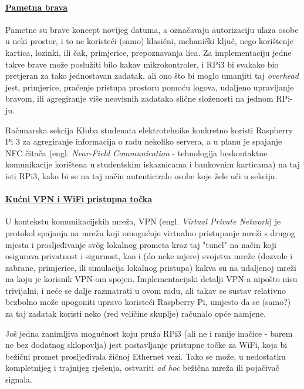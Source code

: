 \documentclass[12pt,a4paper]{article}
\begin{document}
	\paragraph{\underline{Pametna brava}} %
	\label{par:smart_lock}
		Pametne su brave koncept novijeg datuma, a označavaju autorizaciju ulaza osobe u neki prostor, i to ne koristeći (samo) klasični, mehanički ključ, nego korištenje kartica, lozinki, ili čak, primjerice, prepoznavanja lica. Za implementaciju jedne takve brave može poslužiti bilo kakav mikrokontroler, i RPi3 bi svakako bio pretjeran za tako jednostavan zadatak, ali ono što bi moglo umanjiti taj \textit{overhead} jest, primjerice, praćenje pristupa prostoru pomoću logova, udaljeno upravljanje bravom, ili agregiranje više neovisnih zadataka slične složenosti na jednom RPi-ju.
		\par Računarska sekcija Kluba studenata elektrotehnike konkretno koristi Raspberry Pi 3 za agregiranje informacija o radu nekoliko servera, a u planu je spajanje NFC čitača (engl. \textit{Near-Field Communication} - tehnologija beskontaktne komunikacije korištena u studentskim iskaznicama i bankovnim karticama) na taj isti RPi3, kako bi se na taj način autenticiralo osobe koje žele ući u sekciju.


	\paragraph{\underline{Kućni VPN i WiFi pristupna točka}} %
	\label{par:home_vpn}
		U kontekstu komunikacijskih mreža, VPN (engl. \textit{Virtual Private Network}) je protokol spajanja na mrežu koji omogućuje virtualno pristupanje mreži s drugog mjesta i prosljeđivanje svòg lokalnog prometa kroz taj "tunel" na način koji osigurava privatnost i sigurnost, kao i (do neke mjere) svojstva mreže (dozvole i zabrane, primjerice, ili simulacija lokalnog pristupa) kakva su na udaljenoj mreži na koju je korisnik VPN-om spojen. Implementacijski detalji VPN-a nipošto nisu trivijalni, i neće se dalje razmatrati u ovom radu, ali takav se sustav relativno bezbolno može upogoniti upravo koristeći Raspberry Pi, umjesto da se (samo?) za taj zadatak koristi neko (red veličine skuplje) računalo opće namjene.
		\par Još jedna zanimljiva mogućnost koju pruža RPi3 (ali ne i ranije inačice - barem ne bez dodatnog sklopovlja) jest postavljanje pristupne točke za WiFi, koja bi bežični promet prosljeđivala žičnoj Ethernet vezi. Tako se može, u nedostatku kompletnijeg i trajnijeg rješenja, ostvariti \textit{ad hoc} bežična mreža ili pojačivač signala.
\end{document}
